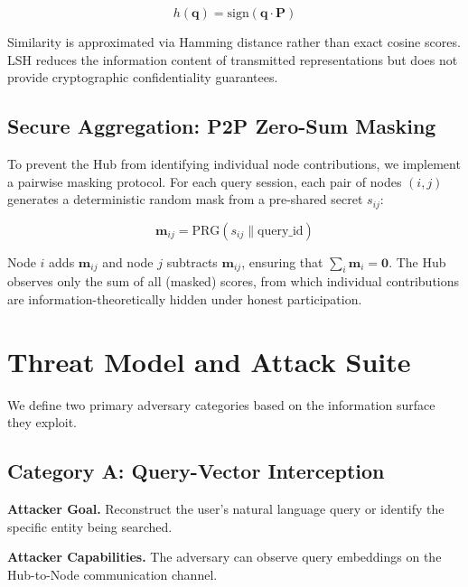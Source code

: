 \documentclass[conference]{IEEEtran}
\begin{document}
\begin{equation}
    h(\mathbf{q}) = \text{sign}(\mathbf{q} \cdot \mathbf{P})
\end{equation}

Similarity is approximated via Hamming distance rather than exact cosine scores. LSH reduces the information content of transmitted representations but does not provide cryptographic confidentiality guarantees.

\subsection{Secure Aggregation: P2P Zero-Sum Masking}

To prevent the Hub from identifying individual node contributions, we implement a pairwise masking protocol. For each query session, each pair of nodes $(i, j)$ generates a deterministic random mask from a pre-shared secret $s_{ij}$:

\begin{equation}
    \mathbf{m}_{ij} = \text{PRG}(s_{ij} \| \text{query\_id})
\end{equation}

Node $i$ adds $\mathbf{m}_{ij}$ and node $j$ subtracts $\mathbf{m}_{ij}$, ensuring that $\sum_i \mathbf{m}_i = \mathbf{0}$. The Hub observes only the sum of all (masked) scores, from which individual contributions are information-theoretically hidden under honest participation.

\section{Threat Model and Attack Suite}
\label{sec:threat}

We define two primary adversary categories based on the information surface they exploit.

\subsection{Category A: Query-Vector Interception}

\textbf{Attacker Goal.} Reconstruct the user's natural language query or identify the specific entity being searched.

\textbf{Attacker Capabilities.} The adversary can observe query embeddings on the Hub-to-Node communication channel.
\end{document}
